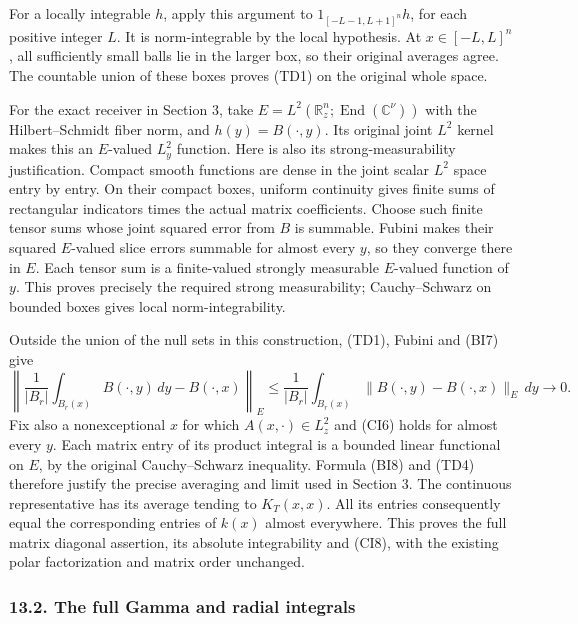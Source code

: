 \documentclass[
  11pt,
]{article}
\begin{document}
For a locally integrable \(h\), apply this argument to
\(1_{[-L-1,L+1]^n}h\), for each positive integer \(L\). It is
norm-integrable by the local hypothesis. At \(x\in[-L,L]^n\), all
sufficiently small balls lie in the larger box, so their original
averages agree. The countable union of these boxes proves (TD1) on the
original whole space.

For the exact receiver in Section 3, take
\(E=L^2(\mathbb R^n_z;\operatorname{End}(\mathbb C^\nu))\) with the
Hilbert--Schmidt fiber norm, and \(h(y)=B(\cdot,y)\). Its original joint
\(L^2\) kernel makes this an \(E\)-valued \(L^2_y\) function. Here is
also its strong-measurability justification. Compact smooth functions
are dense in the joint scalar \(L^2\) space entry by entry. On their
compact boxes, uniform continuity gives finite sums of rectangular
indicators times the actual matrix coefficients. Choose such finite
tensor sums whose joint squared error from \(B\) is summable. Fubini
makes their squared \(E\)-valued slice errors summable for almost every
\(y\), so they converge there in \(E\). Each tensor sum is a
finite-valued strongly measurable \(E\)-valued function of \(y\). This
proves precisely the required strong measurability; Cauchy--Schwarz on
bounded boxes gives local norm-integrability.

Outside the union of the null sets in this construction, (TD1), Fubini
and (BI7) give \[
 \left\|\frac1{|B_r|}\int_{B_r(x)}B(\cdot,y)\,dy
                     -B(\cdot,x)\right\|_E
 \leq\frac1{|B_r|}\int_{B_r(x)}
           \|B(\cdot,y)-B(\cdot,x)\|_E\,dy\longrightarrow0.
                                                               \tag{TD4}
\] Fix also a nonexceptional \(x\) for which \(A(x,\cdot)\in L^2_z\) and
(CI6) holds for almost every \(y\). Each matrix entry of its product
integral is a bounded linear functional on \(E\), by the original
Cauchy--Schwarz inequality. Formula (BI8) and (TD4) therefore justify
the precise averaging and limit used in Section 3. The continuous
representative has its average tending to \(K_T(x,x)\). All its entries
consequently equal the corresponding entries of \(k(x)\) almost
everywhere. This proves the full matrix diagonal assertion, its absolute
integrability and (CI8), with the existing polar factorization and
matrix order unchanged.

\subsubsection{13.2. The full Gamma and radial
integrals}\label{the-full-gamma-and-radial-integrals}
\end{document}
